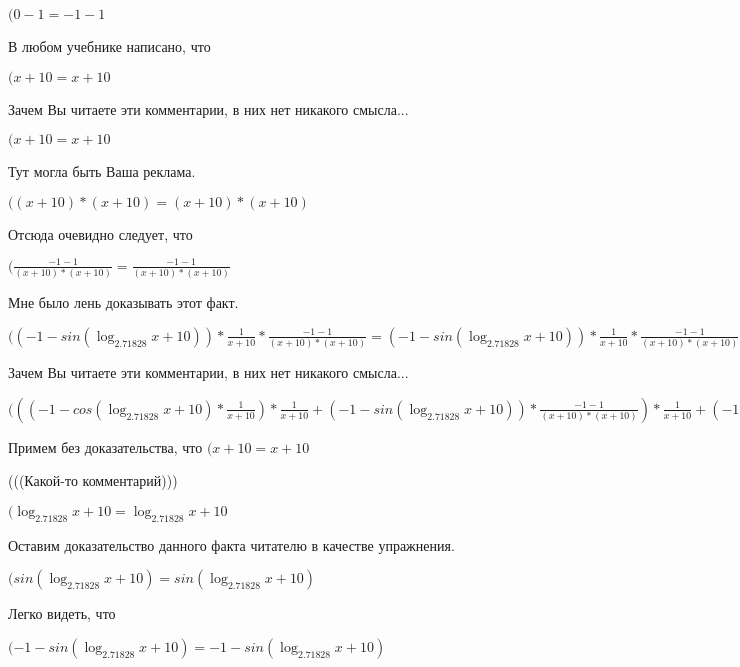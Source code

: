 \documentclass[12pt,a4paper,fleqn]{article}
\theoremstyle{definition}
\begin{document}
$( 0  -  1  =  -1  -  1 $

В любом учебнике написано, что

$( x  +  10  =  x  +  10 $

Зачем Вы читаете эти комментарии, в них нет никакого смысла...

$( x  +  10  =  x  +  10 $

Тут могла быть Ваша реклама.

$(( x  +  10 ) * ( x  +  10 ) = ( x  +  10 ) * ( x  +  10 )$

Отсюда очевидно следует, что

$(\frac{ -1  -  1 }{( x  +  10 ) * ( x  +  10 )}
 = \frac{ -1  -  1 }{( x  +  10 ) * ( x  +  10 )}
$

Мне было лень доказывать этот факт.

$(( -1  - sin(\log_{ 2.71828 }{ x  +  10 })) * \frac{ 1 }{ x  +  10 }
 * \frac{ -1  -  1 }{( x  +  10 ) * ( x  +  10 )}
 = ( -1  - sin(\log_{ 2.71828 }{ x  +  10 })) * \frac{ 1 }{ x  +  10 }
 * \frac{ -1  -  1 }{( x  +  10 ) * ( x  +  10 )}
$

Зачем Вы читаете эти комментарии, в них нет никакого смысла...

$((( -1  - cos(\log_{ 2.71828 }{ x  +  10 }) * \frac{ 1 }{ x  +  10 }
) * \frac{ 1 }{ x  +  10 }
 + ( -1  - sin(\log_{ 2.71828 }{ x  +  10 })) * \frac{ -1  -  1 }{( x  +  10 ) * ( x  +  10 )}
) * \frac{ 1 }{ x  +  10 }
 + ( -1  - sin(\log_{ 2.71828 }{ x  +  10 })) * \frac{ 1 }{ x  +  10 }
 * \frac{ -1  -  1 }{( x  +  10 ) * ( x  +  10 )}
 = (( -1  - cos(\log_{ 2.71828 }{ x  +  10 }) * \frac{ 1 }{ x  +  10 }
) * \frac{ 1 }{ x  +  10 }
 + ( -1  - sin(\log_{ 2.71828 }{ x  +  10 })) * \frac{ -1  -  1 }{( x  +  10 ) * ( x  +  10 )}
) * \frac{ 1 }{ x  +  10 }
 + ( -1  - sin(\log_{ 2.71828 }{ x  +  10 })) * \frac{ 1 }{ x  +  10 }
 * \frac{ -1  -  1 }{( x  +  10 ) * ( x  +  10 )}
$

Примем без доказательства, что
$( x  +  10  =  x  +  10 $

(((Какой-то комментарий)))

$(\log_{ 2.71828 }{ x  +  10 } = \log_{ 2.71828 }{ x  +  10 }$

Оставим доказательство данного факта читателю в качестве упражнения.

$(sin(\log_{ 2.71828 }{ x  +  10 }) = sin(\log_{ 2.71828 }{ x  +  10 })$

Легко видеть, что

$( -1  - sin(\log_{ 2.71828 }{ x  +  10 }) =  -1  - sin(\log_{ 2.71828 }{ x  +  10 })$
\end{document}
